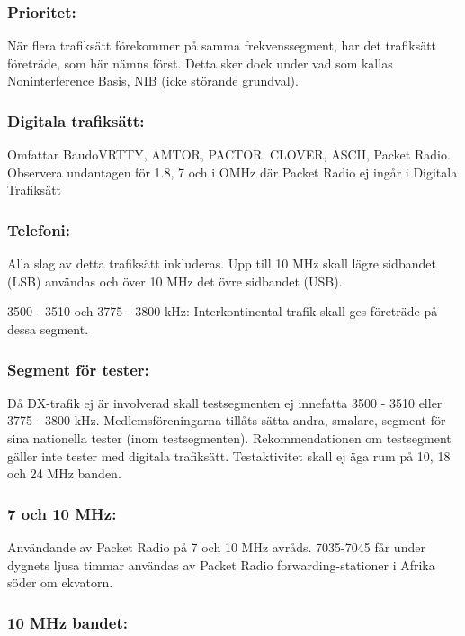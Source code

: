 \subsubsection{Prioritet:}

När flera trafiksätt förekommer på samma frekvenssegment, har det
trafiksätt företräde, som här nämns först. Detta sker dock under
vad som kallas Noninterference Basis, NIB (icke störande grundval).

\subsubsection{Digitala trafiksätt:}

Omfattar BaudoVRTTY, AMTOR, PACTOR, CLOVER, ASCII, Packet Radio.
Observera undantagen för 1.8, 7 och i OMHz där Packet Radio ej
ingår i Digitala Trafiksätt

\subsubsection{Telefoni:}

Alla slag av detta trafiksätt inkluderas. Upp till 10 MHz
skall lägre sidbandet (LSB) användas och över 10 MHz
det övre sidbandet (USB).

3500 - 3510 och 3775 - 3800 kHz:
Interkontinental trafik skall ges företräde på dessa segment.

\subsubsection{Segment för tester:}

Då DX-trafik ej är involverad skall testsegmenten ej innefatta
3500 - 3510 eller 3775 - 3800 kHz. Medlemsföreningarna tillåts
sätta andra, smalare, segment för sina nationella tester
(inom testsegmenten). Rekommendationen om testsegment gäller
inte tester med digitala trafiksätt.
Testaktivitet skall ej äga rum på 10, 18 och 24 MHz banden.

\subsubsection{7 och 10 MHz:}

Användande av Packet Radio på 7 och 10 MHz avråds.
7035-7045 får under dygnets ljusa timmar användas av
Packet Radio forwarding-stationer i Afrika söder om
ekvatorn.

\subsubsection{10 MHz bandet:}


